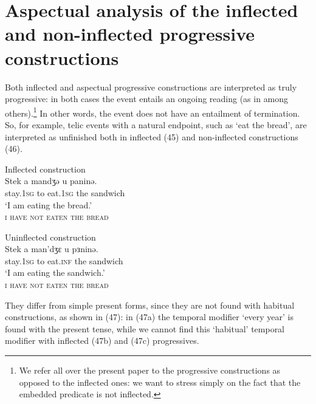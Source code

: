 \documentclass[output=paper]{langsci/langscibook}
\begin{document}
\section{Aspectual analysis of the inflected and non-inflected progressive constructions}%
Both inflected and  aspectual progressive constructions are interpret\-ed as truly progressive: in both cases the event entails an ongoing reading (as in \citealt{Arosio2011} among others).\footnote{We refer all over the present paper to the progressive  constructions as opposed to the inflected ones: we want to stress simply on the fact that the embedded predicate is not inflected.} In other words, the event does not have an entailment of termination. So, for example, telic events with a natural endpoint, such as ‘eat the bread’, are interpreted as unfinished both in inflected (45) and non-inflected constructions (46). 

\ea%
         Inflected construction\label{ex:lorusso:45}\\
    \gll Stek     a  mandʒə   u  paninə. \\
         stay.\textsc{1sg} to  eat.\textsc{1sg} the   sandwich \\
    \glt ‘I am eating the bread.’\\\textsc{i have not eaten the bread}
\z



\ea%
         Uninflected construction\label{ex:lorusso:46}\\
    \gll Stek     a  man’dʒɛ  u  pɜninə.     \\
         stay.\textsc{1sg} to  eat.\textsc{inf} the   sandwich \\
    \glt ‘I am eating the sandwich.’\\\textsc{i have not eaten the bread}
\z 

They differ from simple present forms, since they are not found with habitual constructions, as shown in (47): in (47a) the temporal modifier ‘every year’ is found with the present tense, while we cannot find this ‘habitual’ temporal modifier with inflected (47b) and  (47c) progressives.

\ea%
    \label{ex:lorusso:47}
    \z
\z
\end{document}
